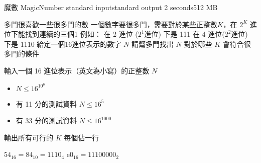 \gdef\thisproblemauthor{}
\gdef\thisproblemdeveloper{}
\gdef\thisproblemorigin{}
\begin{problem}{魔數 MagicNumber}
{standard input}{standard output}
{2 seconds}{512 MB}{}

多門很喜歡一些很多門的數\newline
一個數字要很多門，需要對於某些正整數$K$，在 $2^K$ 進位下能找到連續的三個1\newline
\newline
例如： 在 2 進位 ($2^1$進位) 下是 111 在 4 進位($2^2$進位) 下是 1110\newline
\newline
給定一個16進位表示的數字 $N$\newline
請幫多門找出 $N$ 對於哪些 $K$ 會符合很多門的條件\newline

\InputFile

輸入一個 16 進位表示（英文為小寫）的正整數 $N$
\begin{iofmt}
\begin{itemize}
	\item $N \leq 16^{10^6}$
	\item 有 11 分的測試資料 $N \leq 16^5$
	\item 有 33 分的測試資料 $N \leq 16^1000$
\end{itemize}
\end{iofmt}

\OutputFile

輸出所有可行的 $K$ \newline
每個佔一行

\Examples

\begin{example}
%
%
%
\end{example}
$54_{16} = 84_{10} = 1110_4$ \newline
$\textrm{e}0_{16} = 1110 0000_2$ \newline

\end{problem}
